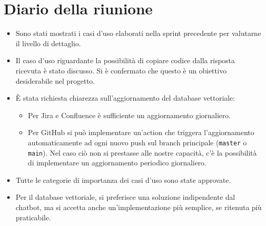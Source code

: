 
\section{Diario della riunione}

\begin{itemize}
    \item Sono stati mostrati i casi d'uso elaborati nella sprint precedente per valutarne il livello di dettaglio.
    \item Il caso d'uso riguardante la possibilità di copiare codice dalla risposta ricevuta è stato discusso. Si è confermato che questo è un obiettivo desiderabile nel progetto. 
    \item È stata richiesta chiarezza sull'aggiornamento del database vettoriale:
    \begin{itemize}
        \item Per Jira e Confluence è sufficiente un aggiornamento giornaliero.
        \item Per GitHub si può implementare un'action che triggera l'aggiornamento automaticamente ad ogni nuovo push sul branch principale (\texttt{master} o \texttt{main}). Nel caso ciò non si prestasse alle nostre capacità, c'è la possibilità di implementare un aggiornamento periodico giornaliero.
    \end{itemize}
    \item Tutte le categorie di importanza dei casi d'uso sono state approvate.
    \item Per il database vettoriale, si preferisce una soluzione indipendente dal chatbot, ma si accetta anche un'implementazione più semplice, se ritenuta più praticabile.
\end{itemize}